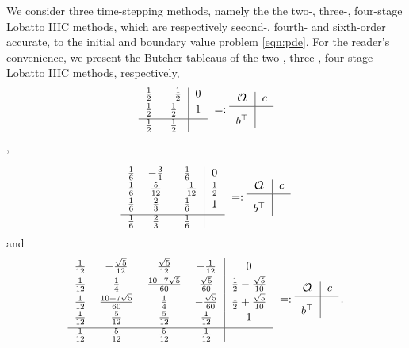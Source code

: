 \documentclass[a4paper, oneside]{book}
\def\AA{\text{${\mathcal O}\hskip-3pt\iota$}}
\begin{document}
We consider three time-stepping methods,
namely the the two-, three-, four-stage Lobatto IIIC methods, which are respectively second-, fourth- and sixth-order accurate, to the
initial and boundary value problem \eqref{eqn:pde}.
For the reader's convenience, we present the Butcher tableaus of the
two-, three-, four-stage Lobatto IIIC methods, respectively,
%
\begin{equation}
\label{2-stage}
\begin{tabular}{cc|c}
 $\frac12$ &  $-\frac12$  & $0$\\[2pt]
 $\frac12$  & $\frac12 $& $1$ \\[2pt]
\hline
 $\frac12 $  & $\frac12$  & $\; $ \\
\end{tabular}
\ =:
\begin{tabular}{c|c}
 $\AA$ & $c$ \\[1pt]
\hline
 $b^\top$  & $\vphantom{\sum^{\sum^\sum}} $ \\
\end{tabular}
\end{equation},

\begin{equation}
\label{3-stage}
\begin{tabular}{ccc|c}
 $\frac16$ &  $-\frac31$
 & $\frac16$ & $0$ \\[2pt]
 $\frac16$  & $\frac5{12}$
 & $-\frac1{12}$ & $\frac12$ \\[2pt]
 $\frac16$  & $\frac23$
 & $\frac16$ & $1$ \\*[3pt]
\hline
 $\frac16 $  & $\frac23$ & $ \frac16$   & $\; $ \\
\end{tabular}
\ =:
\begin{tabular}{c|c}
 $\AA$ & $c$ \\[1pt]
\hline
 $b^\top$  & $\vphantom{\sum^{\sum^\sum}} $ \\
\end{tabular}
\end{equation}
%
and
%
\begin{equation}
\label{4-stage}
\begin{tabular}{cccc|c}
 $\frac1{12}$ &  $-\frac {\sqrt{5}}{12}$
 & $\frac {\sqrt{5}}{12}$ & $-\frac1{12}$ & $0$ \\*[2pt]
 $\frac1{12}$  & $\frac14 $ & $\frac{10-7\sqrt{5}}{60}$
 & $\frac{\sqrt{5}}{60}$
 & $\frac12-\frac{\sqrt{5}}{10}$\\*[2pt]
 $\frac1{12}$  & $\frac{10+7\sqrt{5}}{60}$
 &$\frac14$& $-\frac{\sqrt{5}}{60}$
 &  $\frac12+\frac{\sqrt{5}}{10}$ \\*[2pt]
  $\frac1{12}$ & $\frac5{12}$ &  $\frac5{12}$
 & $\frac1{12}$ & $1$ \\[3pt]
\hline
   $\frac1{12}$ & $\frac5{12}$ &  $\frac5{12}$
 & $\frac1{12}$ &  \\
\end{tabular}
\ =:
\begin{tabular}{c|c}
 $\AA$ & $c$ \\[1pt]
\hline
 $b^\top$  & $\vphantom{\sum^{\sum^\sum}} $ \\
\end{tabular}
\,.
\end{equation}
%
\end{document}
